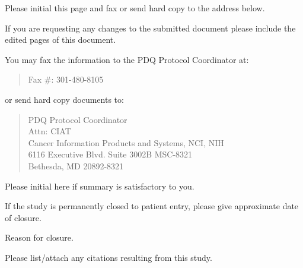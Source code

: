 \documentclass[12pt]{article}
\begin{document}
\newpage
Please initial this page and fax or send hard copy to the address below. 

If you are requesting any changes to the submitted document please include 
the edited pages of this document.

You may fax the information to the PDQ Protocol Coordinator at:
\begin{verse}
Fax \#:  301-480-8105
\end{verse}

or send hard copy documents to:
\begin{verse}
PDQ Protocol Coordinator    \\
Attn: CIAT                  \\
Cancer Information Products and Systems, NCI, NIH   \\
6116 Executive Blvd. Suite 3002B MSC-8321           \\
Bethesda, MD 20892-8321
\end{verse}

Please initial here if summary is satisfactory to you. 
\hrulefill

If the study is permanently closed to patient entry, please give approximate 
date of closure. 
\hrulefill

Reason for closure. 
\hrulefill      \newline
\mbox{}\hrulefill \newline
\mbox{}\hrulefill \newline
\mbox{}\hrulefill \newline
\mbox{}\hrulefill

Please list/attach any citations resulting from this study.
\vfill
\end{document}
